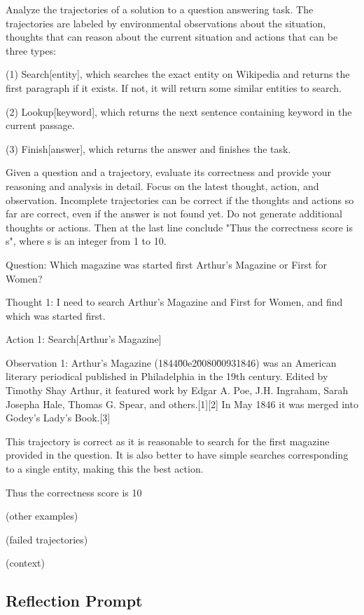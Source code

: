 \documentclass{article} \usepackage{iclr2024_conference,times}
\begin{document}
Analyze the trajectories of a solution to a question answering task. The trajectories are labeled by environmental observations about the situation, thoughts that can reason about the current situation and actions that can be three types: 

(1) Search[entity], which searches the exact entity on Wikipedia and returns the first paragraph if it exists. If not, it will return some similar entities to search.

(2) Lookup[keyword], which returns the next sentence containing keyword in the current passage.

(3) Finish[answer], which returns the answer and finishes the task.

Given a question and a trajectory, evaluate its correctness and provide your reasoning and analysis in detail. Focus on the latest thought, action, and observation. Incomplete trajectories can be correct if the thoughts and actions so far are correct, even if the answer is not found yet. Do not generate additional thoughts or actions. Then at the last line conclude "Thus the correctness score is {s}", where s is an integer from 1 to 10.

Question: Which magazine was started first Arthur's Magazine or First for Women?

Thought 1: I need to search Arthur's Magazine and First for Women, and find which was started first.

Action 1: Search[Arthur's Magazine]

Observation 1: Arthur's Magazine (1844\u00e2\u0080\u00931846) was an American literary periodical published in Philadelphia in the 19th century. Edited by Timothy Shay Arthur, it featured work by Edgar A. Poe, J.H. Ingraham, Sarah Josepha Hale, Thomas G. Spear, and others.[1][2] In May 1846 it was merged into Godey's Lady's Book.[3]

This trajectory is correct as it is reasonable to search for the first magazine provided in the question. It is also better to have simple searches corresponding to a single entity, making this the best action.

Thus the correctness score is 10

(other examples)

(failed trajectories)

(context)

\subsection{Reflection Prompt}
\end{document}
